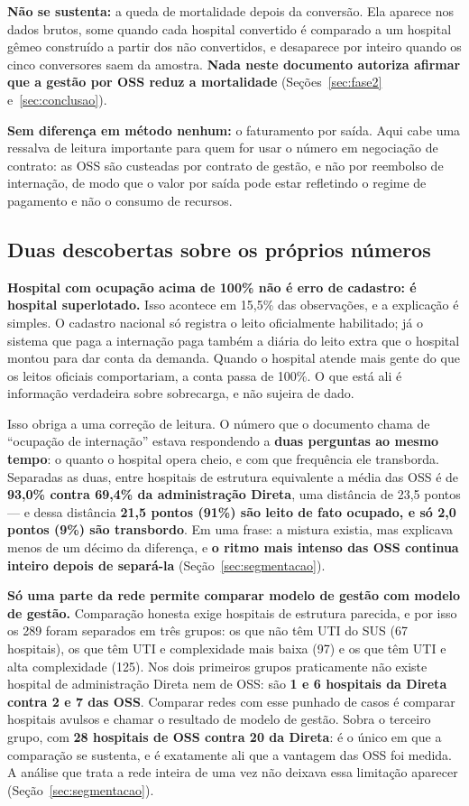 \textbf{Não se sustenta:} a queda de mortalidade depois da conversão. Ela
aparece nos dados brutos, some quando cada hospital convertido é comparado
a um hospital gêmeo construído a partir dos não convertidos, e desaparece
por inteiro quando os cinco conversores saem da amostra. \textbf{Nada
neste documento autoriza afirmar que a gestão por OSS reduz a
mortalidade} (Seções~\ref{sec:fase2} e~\ref{sec:conclusao}).

\textbf{Sem diferença em método nenhum:} o faturamento por saída. Aqui
cabe uma ressalva de leitura importante para quem for usar o número em
negociação de contrato: as OSS são custeadas por contrato de gestão, e não
por reembolso de internação, de modo que o valor por saída pode estar
refletindo o regime de pagamento e não o consumo de recursos.

\subsection*{Duas descobertas sobre os próprios números}

\textbf{Hospital com ocupação acima de 100\% não é erro de cadastro: é
hospital superlotado.} Isso acontece em 15,5\% das observações, e a
explicação é simples. O cadastro nacional só registra o leito oficialmente
habilitado; já o sistema que paga a internação paga também a diária do
leito extra que o hospital montou para dar conta da demanda. Quando o
hospital atende mais gente do que os leitos oficiais comportariam, a conta
passa de 100\%. O que está ali é informação verdadeira sobre sobrecarga, e
não sujeira de dado.

Isso obriga a uma correção de leitura. O número que o documento chama de
``ocupação de internação'' estava respondendo a \textbf{duas perguntas ao
mesmo tempo}: o quanto o hospital opera cheio, e com que frequência ele
transborda. Separadas as duas, entre hospitais de estrutura equivalente a
média das OSS é de \textbf{93,0\% contra 69,4\% da administração Direta},
uma distância de 23,5 pontos --- e dessa distância \textbf{21,5 pontos
(91\%) são leito de fato ocupado, e só 2,0 pontos (9\%) são transbordo}.
Em uma frase: a mistura existia, mas explicava menos de um décimo da
diferença, e \textbf{o ritmo mais intenso das OSS continua inteiro depois
de separá-la} (Seção~\ref{sec:segmentacao}).

\textbf{Só uma parte da rede permite comparar modelo de gestão com modelo
de gestão.} Comparação honesta exige hospitais de estrutura parecida, e por
isso os 289 foram separados em três grupos: os que não têm UTI do SUS
(67 hospitais), os que têm UTI e complexidade mais baixa (97) e os que têm
UTI e alta complexidade (125). Nos dois primeiros grupos praticamente não
existe hospital de administração Direta nem de OSS: são \textbf{1 e 6
hospitais da Direta contra 2 e 7 das OSS}. Comparar redes com esse punhado
de casos é comparar hospitais avulsos e chamar o resultado de modelo de
gestão. Sobra o terceiro grupo, com \textbf{28 hospitais de OSS contra 20
da Direta}: é o único em que a comparação se sustenta, e é exatamente ali
que a vantagem das OSS foi medida. A análise que trata a rede inteira de
uma vez não deixava essa limitação aparecer (Seção~\ref{sec:segmentacao}).

